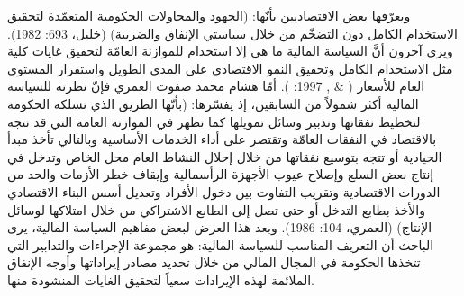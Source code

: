 \documentclass[10pt,a4paper]{report}
\begin{document}
\begin{doublespacing}
ويعرّفها بعض الاقتصاديين بأنّها: (الجهود والمحاولات الحكومية المتعمّدة لتحقيق الاستخدام الكامل دون التضخّم من خلال سياستي الإنفاق والضريبة) {(خليل، 693: 1982)}.
ويرى آخرون أنَّ السياسة المالية ما هي إلا استخدام للموازنة العامّة لتحقيق غايات كلية مثل الاستخدام الكامل وتحقيق النمو الاقتصادي على المدى الطويل واستقرار المستوى العام للأسعار {( \& , 1997: )}.
أمّا هشام محمد صفوت العمري فإنّ نظرته للسياسة المالية أكثر شمولاً من السابقين، إذ يفسّرها: (بأنّها الطريق الذي تسلكه الحكومة لتخطيط نفقاتها وتدبير وسائل تمويلها كما تظهر في الموازنة العامة التي قد تتجه بالاقتصاد في النفقات العامّة وتقتصر على أداء الخدمات الأساسية وبالتالي تأخذ مبدأ الحيادية أو تتجه بتوسيع نفقاتها من خلال إحلال النشاط العام محل الخاص وتدخل في إنتاج بعض السلع وإصلاح عيوب الأجهزة الرأسمالية وإيقاف خطر الأزمات والحد من الدورات الاقتصادية وتقريب التفاوت بين دخول الأفراد وتعديل أسس البناء الاقتصادي والأخذ بطابع التدخل أو حتى تصل إلى الطابع الاشتراكي من خلال امتلاكها لوسائل الإنتاج) {(العمري، 104: 1986)}.
وبعد هذا العرض لبعض مفاهيم السياسة المالية، يرى الباحث أن التعريف المناسب للسياسة المالية: هو مجموعة الإجراءات والتدابير التي تتخذها الحكومة في المجال المالي من خلال تحديد مصادر إيراداتها وأوجه الإنفاق الملائمة لهذه الإيرادات سعياً لتحقيق الغايات المنشودة منها.

\end{doublespacing}
\end{document}
